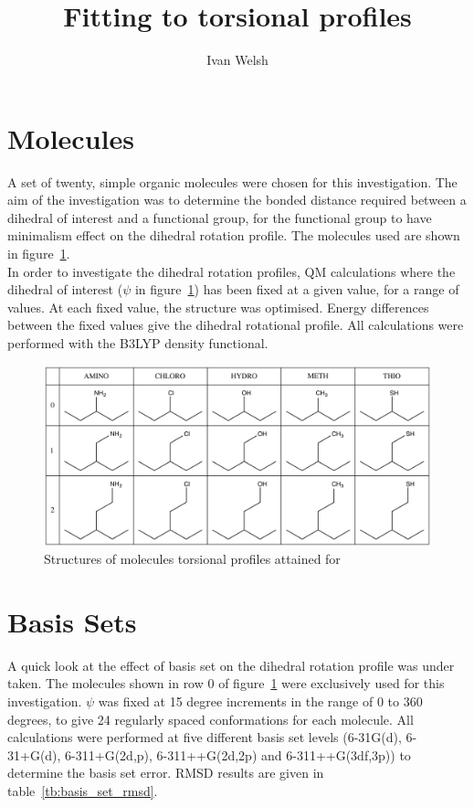 \documentclass[11pt, oneside, draft]{article}   	%
\title{Fitting to torsional profiles}
\author{Ivan Welsh}
\begin{document}
\maketitle

\section{Molecules}
A set of twenty, simple organic molecules were chosen for this investigation. The aim of the investigation was to determine the bonded distance required between a dihedral of interest and a functional group, for the functional group to have minimalism effect on the dihedral rotation profile. The molecules used are shown in figure~\ref{fig:structures}.\\
In order to investigate the dihedral rotation profiles, QM calculations where the dihedral of interest ($\psi$ in figure~\ref{fig:structures}) has been fixed at a given value, for a range of values. At each fixed value, the structure was optimised. Energy differences between the fixed values give the dihedral rotational profile. All calculations were performed with the B3LYP density functional.
\begin{figure}
\centering
\includegraphics[width=0.9\textheight]{Images/molecules}
\caption{Structures of molecules torsional profiles attained for}
\label{fig:structures}
\end{figure}

\section{Basis Sets}
A quick look at the effect of basis set on the dihedral rotation profile was under taken. The molecules shown in row 0 of figure~\ref{fig:structures} were exclusively used for this investigation. $\psi$ was fixed at 15 degree increments in the range of 0 to 360 degrees, to give 24 regularly spaced conformations for each molecule. All calculations were performed at five different basis set levels (6-31G(d), 6-31+G(d), 6-311+G(2d,p), 6-311++G(2d,2p) and 6-311++G(3df,3p)) to determine the basis set error. RMSD results are given in table~\ref{tb:basis_set_rmsd}.
\end{document}
